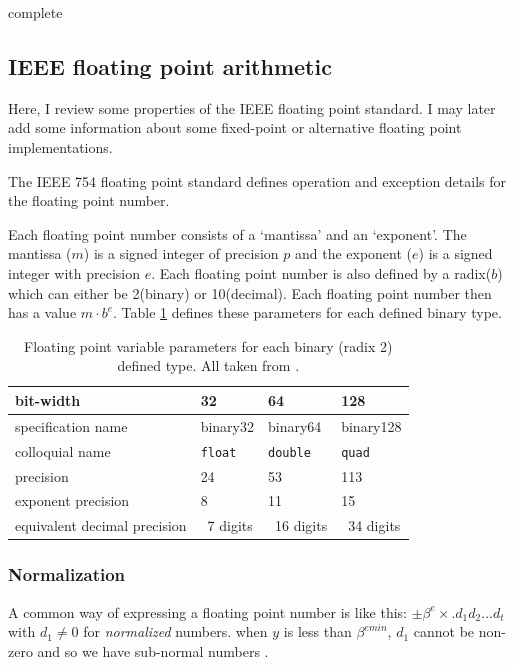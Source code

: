 \documentclass[american]{article}
\newcommand{\complete}{
	\gls{complete}
}
\begin{document}
\complete

\subsection{IEEE floating point arithmetic} \label{sec:precision-ieee-float}

Here, I review some properties of the IEEE floating point standard. I may later add some information about some fixed-point or alternative floating point implementations.

The IEEE 754 floating point standard \cite{ieee-754-2008,ieee-754-2008-redline} defines operation and exception details for the floating point number.

Each floating point number consists of a `mantissa' and an `exponent'. The mantissa ($m$) is a signed integer of precision $p$ and the exponent ($e$) is a signed integer with precision $e$. Each floating point number is also defined by a radix($b$) which can either be 2(binary) or 10(decimal). Each floating point number then has a value $m\cdot b^e$. Table \ref{tab:float-par} defines these parameters for each defined binary type.

\FloatBarrier
\begin{table}[t]
	\caption{Floating point variable parameters for each binary (radix 2) defined type. All taken from \cite{ieee-754-2008}.} \label{tab:float-par}
\begin{tabular}{llll}
\hline
bit-width & 32 & 64 & 128 \\
\hline
specification name & binary32 & binary64 & binary128 \\
\hline
colloquial name & \texttt{float} & \texttt{double} & \texttt{quad} \\
\hline
precision & 24 & 53 & 113 \\
\hline
exponent precision & 8 & 11 & 15 \\
\hline
equivalent decimal precision & ~7 digits & ~16 digits & ~34 digits \\
\hline
\end{tabular}
\end{table}
\FloatBarrier

\subsubsection{Normalization} \label{sec:precision-ieee-norm}

A common way of expressing a floating point number is like this: $\pm\beta^e\times. d_1 d_2 \ldots d_t$ with $d_1 \neq 0$ for \textit{normalized} numbers. when $y$ is less than $\beta^{emin}$, $d_1$ cannot be non-zero and so we have sub-normal numbers \cite{higham-numerical-accuracy-and-stability}.
\end{document}

